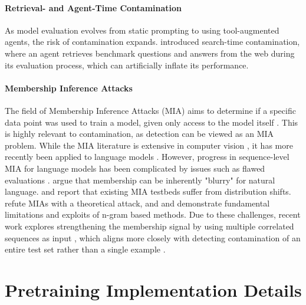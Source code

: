 \paragraph{Retrieval- and Agent-Time Contamination}
As model evaluation evolves from static prompting to using tool-augmented agents, the risk of contamination expands. \citet{han2025searchtimedatacontamination} introduced search-time contamination, where an agent retrieves benchmark questions and answers from the web during its evaluation process, which can artificially inflate its performance.

\paragraph{Membership Inference Attacks}
The field of Membership Inference Attacks (MIA) aims to determine if a specific data point was used to train a model, given only access to the model itself \citep{shokri2017membership}. This is highly relevant to contamination, as detection can be viewed as an MIA problem. While the MIA literature is extensive in computer vision \citep{yeom2018privacy, salem2018ml, sablayrolles2019white, jagielski2024students}, it has more recently been applied to language models \citep{carlini2021extracting,zarifzadeh2023low,shi2024detecting,mattern2023membership,li2023mope}. However, progress in sequence-level MIA for language models has been complicated by issues such as flawed evaluations \citep{meeus2024inherent,zhang2024membership,jiang2025a}. \citet{duan2024membership} argue that membership can be inherently "blurry" for natural language. \citet{das2024blind} and \cite{meeus2024inherent} report that existing MIA testbeds suffer from distribution shifts. \citet{kong2023can} refute MIAs with a theoretical attack, and \citet{liu2025language} and \citet{mangaokar2025really} demonstrate fundamental limitations and exploits of n-gram based methods. Due to these challenges, recent work explores strengthening the membership signal by using multiple correlated sequences as input \citep{maini2021dataset,kandpal2023user,maini2024llm}, which aligns more closely with detecting contamination of an entire test set rather than a single example \citep{golchin2023data,oren2023proving}.


\clearpage

\section{Pretraining Implementation Details}
\label{app:sec:pretraining_implementation_details}

